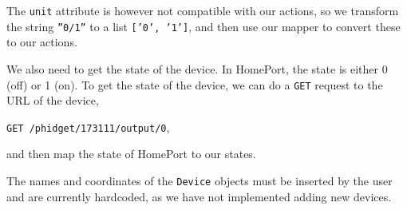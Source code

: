 The \texttt{unit} attribute is however not compatible with our actions, 
so we transform the string \texttt{''0/1''} to a list \texttt{['0', '1']}, 
and then use our mapper to convert these to our actions. 

We also need to get the state of the device. 
In HomePort, the state is either 0 (off) or 1 (on). 
To get the state of the device, 
we can do a \texttt{GET} request to the URL of the device, \eg 
\begin{center}
  \texttt{GET /phidget/173111/output/0},
\end{center}
and then map the state of HomePort to our states.

The names and coordinates of the \texttt{Device} objects must be inserted by the user and are currently hardcoded, 
as we have not implemented adding new devices. 

